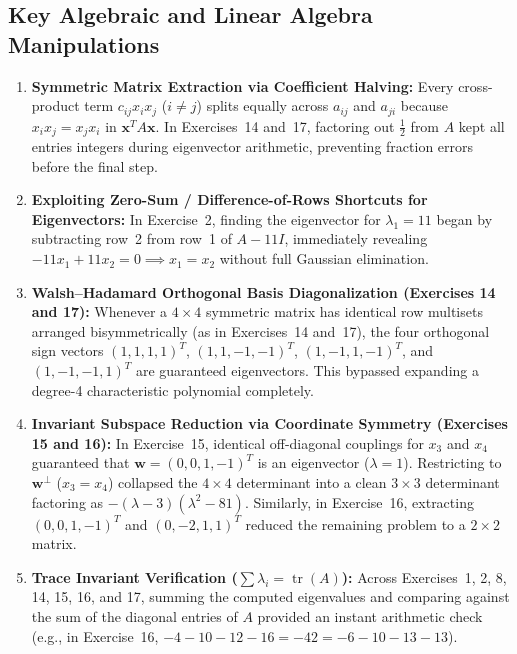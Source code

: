 \documentclass[11pt, letterpaper]{article}
\theoremstyle{definition}
\theoremstyle{remark}
\begin{document}
\subsection{Key Algebraic and Linear Algebra Manipulations}
\begin{enumerate}[label=\textbf{\arabic*.}]
    \item \textbf{Symmetric Matrix Extraction via Coefficient Halving:}
    Every cross-product term $c_{ij} x_i x_j$ ($i \neq j$) splits equally across $a_{ij}$ and $a_{ji}$ because $x_i x_j = x_j x_i$ in $\mathbf{x}^T A \mathbf{x}$. In Exercises~14 and~17, factoring out $\frac{1}{2}$ from $A$ kept all entries integers during eigenvector arithmetic, preventing fraction errors before the final step.

    \item \textbf{Exploiting Zero-Sum / Difference-of-Rows Shortcuts for Eigenvectors:}
    In Exercise~2, finding the eigenvector for $\lambda_1 = 11$ began by subtracting row~2 from row~1 of $A - 11I$, immediately revealing $-11x_1 + 11x_2 = 0 \implies x_1 = x_2$ without full Gaussian elimination.

    \item \textbf{Walsh–Hadamard Orthogonal Basis Diagonalization (Exercises 14 and 17):}
    Whenever a $4 \times 4$ symmetric matrix has identical row multisets arranged bisymmetrically (as in Exercises~14 and~17), the four orthogonal sign vectors $(1,1,1,1)^T$, $(1,1,-1,-1)^T$, $(1,-1,1,-1)^T$, and $(1,-1,-1,1)^T$ are guaranteed eigenvectors. This bypassed expanding a degree-4 characteristic polynomial completely.

    \item \textbf{Invariant Subspace Reduction via Coordinate Symmetry (Exercises 15 and 16):}
    In Exercise~15, identical off-diagonal couplings for $x_3$ and $x_4$ guaranteed that $\mathbf{w} = (0,0,1,-1)^T$ is an eigenvector ($\lambda = 1$). Restricting to $\mathbf{w}^\perp$ ($x_3 = x_4$) collapsed the $4 \times 4$ determinant into a clean $3 \times 3$ determinant factoring as $-(\lambda - 3)(\lambda^2 - 81)$. Similarly, in Exercise~16, extracting $(0,0,1,-1)^T$ and $(0,-2,1,1)^T$ reduced the remaining problem to a $2 \times 2$ matrix.

    \item \textbf{Trace Invariant Verification ($\sum \lambda_i = \operatorname{tr}(A)$):}
    Across Exercises~1, 2, 8, 14, 15, 16, and 17, summing the computed eigenvalues and comparing against the sum of the diagonal entries of $A$ provided an instant arithmetic check (e.g., in Exercise~16, $-4 - 10 - 12 - 16 = -42 = -6 - 10 - 13 - 13$).


\end{enumerate}
\end{document}

